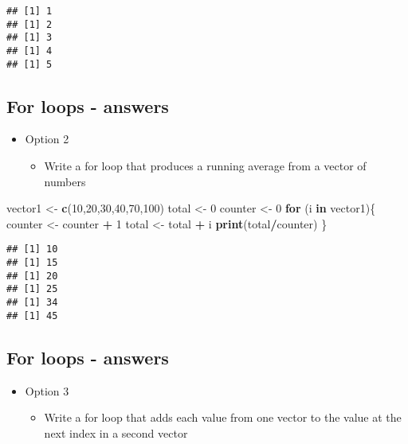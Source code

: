 \documentclass[]{article}
\newenvironment{Shaded}{\begin{snugshade}}{\end{snugshade}}
\newcommand{\KeywordTok}[1]{\textcolor[rgb]{0.13,0.29,0.53}{\textbf{#1}}}
\newcommand{\DecValTok}[1]{\textcolor[rgb]{0.00,0.00,0.81}{#1}}
\newcommand{\StringTok}[1]{\textcolor[rgb]{0.31,0.60,0.02}{#1}}
\newcommand{\ControlFlowTok}[1]{\textcolor[rgb]{0.13,0.29,0.53}{\textbf{#1}}}
\newcommand{\OperatorTok}[1]{\textcolor[rgb]{0.81,0.36,0.00}{\textbf{#1}}}
\newcommand{\NormalTok}[1]{#1}
\providecommand{\tightlist}{%
  \setlength{\itemsep}{0pt}\setlength{\parskip}{0pt}}
\begin{document}
\begin{verbatim}
## [1] 1
## [1] 2
## [1] 3
## [1] 4
## [1] 5
\end{verbatim}

\subsection{For loops - answers}\label{for-loops---answers-1}

\begin{itemize}
\tightlist
\item
  Option 2

  \begin{itemize}
  \tightlist
  \item
    Write a for loop that produces a running average from a vector of
    numbers
  \end{itemize}
\end{itemize}

\begin{Shaded}
\begin{Highlighting}[]
\NormalTok{vector1 <-}\StringTok{ }\KeywordTok{c}\NormalTok{(}\DecValTok{10}\NormalTok{,}\DecValTok{20}\NormalTok{,}\DecValTok{30}\NormalTok{,}\DecValTok{40}\NormalTok{,}\DecValTok{70}\NormalTok{,}\DecValTok{100}\NormalTok{)}
\NormalTok{total <-}\StringTok{ }\DecValTok{0}
\NormalTok{counter <-}\StringTok{ }\DecValTok{0}
\ControlFlowTok{for}\NormalTok{ (i }\ControlFlowTok{in}\NormalTok{ vector1)\{}
\NormalTok{  counter <-}\StringTok{ }\NormalTok{counter }\OperatorTok{+}\StringTok{ }\DecValTok{1}
\NormalTok{  total <-}\StringTok{ }\NormalTok{total }\OperatorTok{+}\StringTok{ }\NormalTok{i}
 \KeywordTok{print}\NormalTok{(total}\OperatorTok{/}\NormalTok{counter)}
\NormalTok{\}}
\end{Highlighting}
\end{Shaded}

\begin{verbatim}
## [1] 10
## [1] 15
## [1] 20
## [1] 25
## [1] 34
## [1] 45
\end{verbatim}

\subsection{For loops - answers}\label{for-loops---answers-2}

\begin{itemize}
\tightlist
\item
  Option 3

  \begin{itemize}
  \tightlist
  \item
    Write a for loop that adds each value from one vector to the value
    at the next index in a second vector
  \end{itemize}
\end{itemize}
\end{document}
